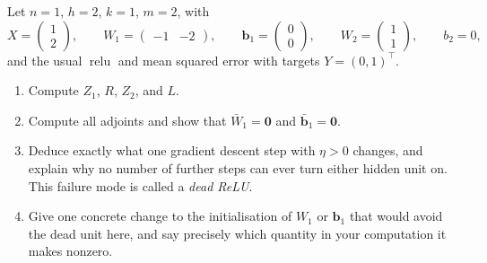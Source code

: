\begin{exercise}\label{ex:ml-6}
Let $n=1$, $h=2$, $k=1$, $m=2$, with
\[
  X=\begin{pmatrix}1\\2\end{pmatrix},\qquad
  W_1=\begin{pmatrix}-1&-2\end{pmatrix},\qquad
  \mathbf{b}_1=\begin{pmatrix}0\\0\end{pmatrix},\qquad
  W_2=\begin{pmatrix}1\\1\end{pmatrix},\qquad b_2=0,
\]
and the usual $\operatorname{relu}$ and mean squared error with targets
$Y=(0,1)^{\!\top}$.
\begin{enumerate}[label=(\alph*)]
  \item Compute $Z_1$, $R$, $Z_2$, and $L$.
  \item Compute all adjoints and show that $\bar W_1=\mathbf{0}$ and
    $\bar{\mathbf b}_1=\mathbf{0}$.
  \item Deduce exactly what one gradient descent step with $\eta>0$ changes,
    and explain why no number of further steps can ever turn either hidden unit
    on. This failure mode is called a \emph{dead ReLU}.
  \item Give one concrete change to the initialisation of $W_1$ or
    $\mathbf{b}_1$ that would avoid the dead unit here, and say precisely which
    quantity in your computation it makes nonzero.
\end{enumerate}
\end{exercise}

